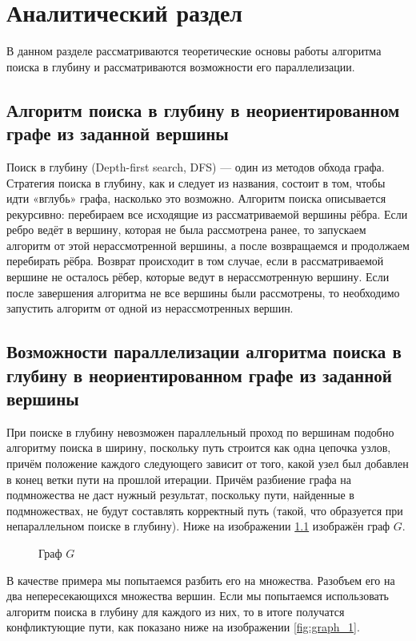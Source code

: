 \chapter{Аналитический раздел}
В данном разделе рассматриваются теоретические основы работы алгоритма поиска в глубину и рассматриваются возможности его параллелизации.

\section{Алгоритм поиска в глубину в неориентированном графе из заданной вершины}
Поиск в глубину (Depth-first search, DFS) — один из методов обхода графа. Стратегия поиска в глубину, как и следует из названия, состоит в том, чтобы идти «вглубь» графа, насколько это возможно. Алгоритм поиска описывается рекурсивно: перебираем все исходящие из рассматриваемой вершины рёбра. Если ребро ведёт в вершину, которая не была рассмотрена ранее, то запускаем алгоритм от этой нерассмотренной вершины, а после возвращаемся и продолжаем перебирать рёбра. Возврат происходит в том случае, если в рассматриваемой вершине не осталось рёбер, которые ведут в нерассмотренную вершину. Если после завершения алгоритма не все вершины были рассмотрены, то необходимо запустить алгоритм от одной из нерассмотренных вершин.

\section{Возможности параллелизации алгоритма поиска в глубину в неориентированном графе из заданной вершины}
При поиске в глубину невозможен параллельный проход по вершинам подобно алгоритму поиска в ширину, поскольку путь строится как одна цепочка узлов, причём положение каждого следующего зависит от того, какой узел был добавлен в конец ветки пути на прошлой итерации. Причём разбиение графа на подмножества не даст нужный результат, поскольку пути, найденные в подмножествах, не будут составлять корректный путь (такой, что образуется при непараллельном поиске в глубину). Ниже на изображении \ref{fig:graph_orig} изображён граф $G$.

\begin{figure}[H]
	\caption{Граф $G$}
	\label{fig:graph_orig}
\end{figure}

В качестве примера мы попытаемся разбить его на множества. Разобъем его на два непересекающихся множества вершин. Если мы попытаемся использовать алгоритм поиска в глубину для каждого из них, то в итоге получатся конфликтующие пути, как показано ниже на изображении \ref{fig:graph_1}.

